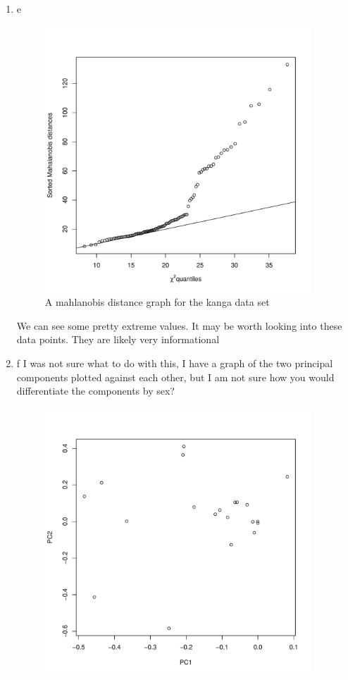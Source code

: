 \documentclass[11pt]{article}
\begin{document}
\begin{enumerate}
\begin{enumerate}
\begin{enumerate}
		\item e
		\begin{figure}[H]
			\centering
			\includegraphics[width=10cm,height=10cm]{kanga.pdf}
			\caption[kg]{A mahlanobis distance graph for the kanga data set}
			\label{kanga}
		\end{figure}
		We can see some pretty extreme values. It may be worth looking into these data points. They are likely very informational
		\item f
		I was not sure what to do with this, I have a graph of the two principal components plotted against each other, but I am not sure how you would differentiate the components by sex?
		\begin{figure}[H]
			\centering
			\includegraphics[width=10cm,height=10cm]{idk.pdf}

\end{figure}
\end{enumerate}
\end{enumerate}
\end{enumerate}
\end{document}

